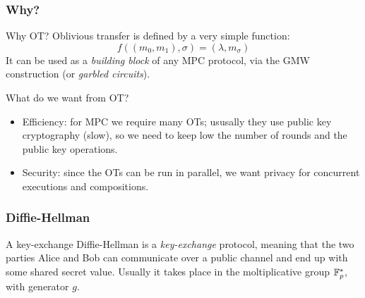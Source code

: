 \documentclass{beamer}
\begin{document}
    \begin{frame}
        \frametitle{Why?}
        \begin{block}{Why OT?}
            Oblivious transfer is defined by a very simple function: $$f((m_0,m_1),\sigma)=(\lambda,m_\sigma)$$
            It can be used as a \emph{building block} of any MPC protocol, via the GMW construction (or \emph{garbled circuits}).
        \end{block}
    
        \pause
        \begin{block}{What do we want from OT?}
            \begin{itemize}
                \item Efficiency: for MPC we require many OTs; ususally they use public key cryptography (slow), so we need to keep low the number of rounds and the public key operations.
                \item Security: since the OTs can be run in parallel, we want privacy for concurrent executions and compositions.
            \end{itemize}
        \end{block}
    
    \end{frame}

    \begin{frame}
        \frametitle{Diffie-Hellman}
        
        \begin{block}{A key-exchange}
            Diffie-Hellman is a \emph{key-exchange} protocol, meaning that the two parties Alice and Bob can communicate over a public channel and end up with some shared secret value.
            Usually it takes place in the moltiplicative group $\mathbb{F}_p^\ast$, with generator $g$.
        \end{block}
        
        \begin{center}
        \end{center}
    \end{frame}
\end{document}
